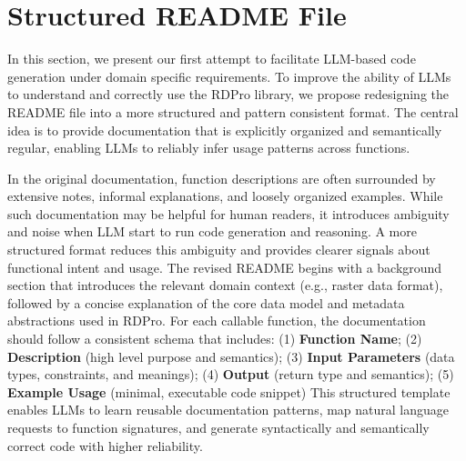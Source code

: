 \section{Structured README File}
In this section, we present our first attempt to facilitate LLM-based code generation under domain specific requirements.
To improve the ability of LLMs to understand and correctly use the RDPro library, we propose redesigning the README file into a more structured and pattern consistent format. The central idea is to provide documentation that is explicitly organized and semantically regular, enabling LLMs to reliably infer usage patterns across functions.

In the original documentation, function descriptions are often surrounded by extensive notes, informal explanations, and loosely organized examples. While such documentation may be helpful for human readers, it introduces ambiguity and noise when LLM start to run code generation and reasoning. A more structured format reduces this ambiguity and provides clearer signals about functional intent and usage. The revised README begins with a background section that introduces the relevant domain context (e.g., raster data format), followed by a concise explanation of the core data model and metadata abstractions used in RDPro. For each callable function, the documentation should follow a consistent schema that includes: 
(1) \textbf{Function Name};
(2) \textbf{Description} (high level purpose and semantics);
(3) \textbf{Input Parameters} (data types, constraints, and meanings);
(4) \textbf{Output} (return type and semantics);
(5) \textbf{Example Usage} (minimal, executable code snippet)
This structured template enables LLMs to learn reusable documentation patterns, map natural language requests to function signatures, and generate syntactically and semantically correct code with higher reliability.